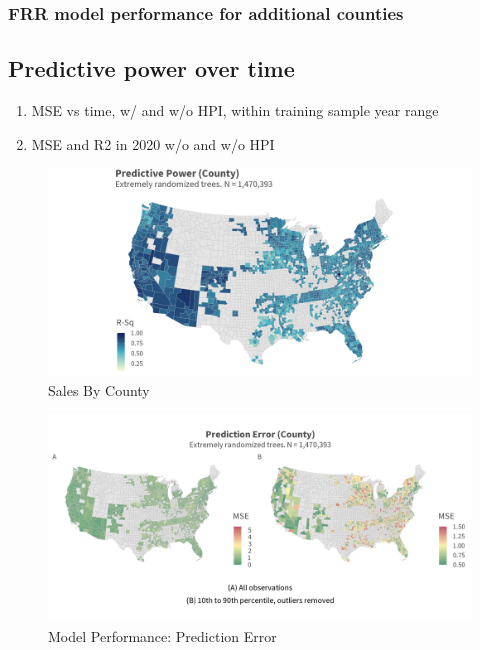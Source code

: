 \documentclass[12pt]{article}
\begin{document}
 \subsubsection{FRR model performance for additional counties}
 

 
  
\subsection{Predictive power over time}

\begin{enumerate}
    \item MSE vs time, w/ and w/o HPI, within training sample year range
    \item MSE and R2 in 2020 w/o and w/o HPI 
\end{enumerate}

 
 
\begin{figure}
    \centering
    \includegraphics[width=6in]{figures/rf_rsq_map.png}
    \caption{Sales By County}
    \label{fig:rsq_county}
\end{figure}

\begin{figure}
    \centering
    \includegraphics[width=6in]{figures/rf_mse_map.png}
    \caption{Model Performance: Prediction Error}
    \label{fig:mse_county}
\end{figure}
\end{document}
